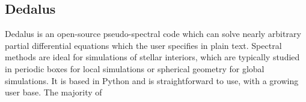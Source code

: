 {\color{purple}    
\subsection{Dedalus}}

Dedalus is an open-source pseudo-spectral code which can solve nearly arbitrary partial differential equations which the user specifies in plain text. Spectral methods are ideal for simulations of stellar interiors, which are typically studied in periodic boxes for local simulations or spherical geometry for global simulations. It is based in Python and is straightforward to use, with a growing user base. The majority of 


